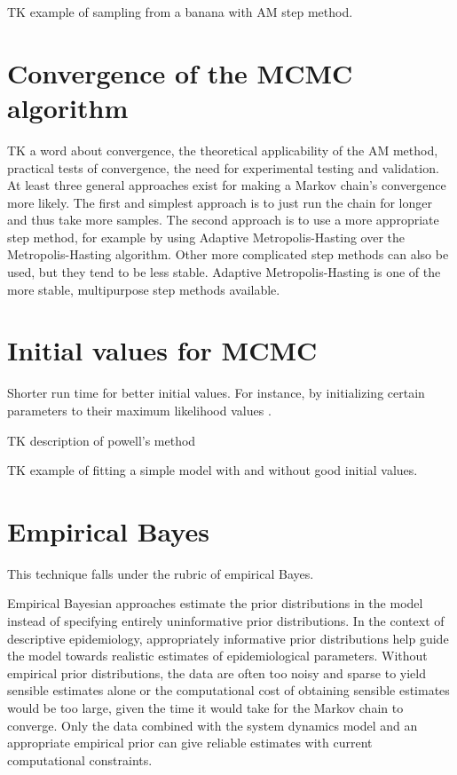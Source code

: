 TK example of sampling from a banana with AM step method.

\section{Convergence of the MCMC algorithm}

TK a word about convergence, the theoretical applicability of the AM
method, practical tests of convergence, the need for experimental
testing and validation.  At least three general approaches exist for
making a Markov chain's convergence more likely. The first and
simplest approach is to just run the chain for longer and thus take
more samples. The second approach is to use a more appropriate step
method, for example by using Adaptive Metropolis-Hasting over the
Metropolis-Hasting algorithm. Other more complicated step methods can
also be used, but they tend to be less stable. Adaptive
Metropolis-Hasting is one of the more stable, multipurpose step
methods available.

\section{Initial values for MCMC}
Shorter run time for better initial values. For instance, by
initializing certain parameters to their maximum likelihood values
\cite{Bishop_Neural_1995}.

TK description of powell's method

TK example of fitting a simple model with and without good initial
values.

\section{Empirical Bayes}

This technique falls under the rubric of empirical Bayes.

Empirical Bayesian approaches estimate the prior distributions in the
model instead of specifying entirely uninformative prior
distributions. In the context of descriptive epidemiology,
appropriately informative prior distributions help guide the model
towards realistic estimates of epidemiological parameters. Without
empirical prior distributions, the data are often too noisy and sparse
to yield sensible estimates alone or the computational cost of
obtaining sensible estimates would be too large, given the time it
would take for the Markov chain to converge. Only the data combined
with the system dynamics model and an appropriate empirical prior can
give reliable estimates with current computational constraints.

